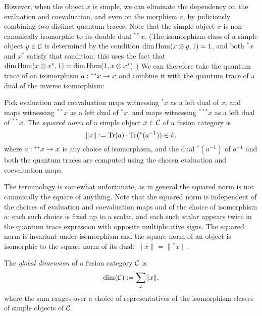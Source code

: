 \documentclass{amsart}
\begin{document}
However, when the object $x$ is simple, we can eliminate the dependency on the evaluation and coevaluation, and even on the morphism $a$, by judiciously combining two distinct quantum traces.  Note that the simple object $x$ is non-canonically isomorphic to its double dual ${}^{**} x$.  (The isomorphism class of a simple object $y \in \mathcal C$ is determined by the condition $\dim \operatorname{Hom}(x \otimes y,1) = 1$, and both ${}^* x$ and $x^*$ satisfy that condition; this uses the fact that $\dim \operatorname{Hom}(x \otimes x^*,1) = \dim \operatorname{Hom}(1, x \otimes x^*)$.)  We can therefore take the quantum trace of an isomorphism $a: {}^{**} x \rightarrow x$ and combine it with the quantum trace of a dual of the inverse isomorphism:
\begin{definition}
Pick evaluation and coevaluation maps witnessing ${}^* x$ as a left dual of $x$, and maps witnessing ${}^{**} x$ as a left dual of ${}^* x$, and maps witnessing ${}^{***} x$ as a left dual of ${}^{**} x$.  The \emph{squared norm} of a simple object $x \in \mathcal C$ of a fusion category is
\[
\lVert x \rVert := \mathrm{Tr}(a) \cdot \mathrm{Tr}({}^*(a^{-1})) \in k,
\]
where $a: {}^{**} x \rightarrow x$ is any choice of isomorphism, and the dual ${}^*(a^{-1})$ of $a^{-1}$ and both the quantum traces are computed using the chosen evaluation and coevaluation maps.
\end{definition}
\nid The terminology is somewhat unfortunate, as in general the squared norm is not canonically the square of anything.  Note that the squared norm is independent of the choices of evaluation and coevaluation maps and of the choice of isomorphism $a$: each such choice is fixed up to a scalar, and each such scalar appears twice in the quantum trace expression with opposite multiplicative signs.  The squared norm is invariant under isomorphism and the square norm of an object is isomorphic to the square norm of its dual: $\lVert x \rVert = \lVert {}^* x \rVert$.
\begin{definition}
The \emph{global dimension} of a fusion category $\mathcal C$ is
\[
\dim(\mathcal C) := \sum_{x} \lVert x \rVert,
\]
where the sum ranges over a choice of representatives of the isomorphism classes of simple objects of $\mathcal C$.
\end{definition}
\end{document}

